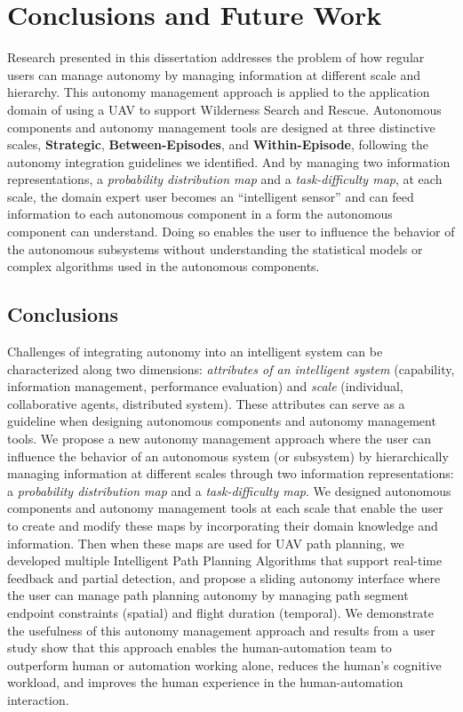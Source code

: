 \chapter[Conclusions and Future Work]{Conclusions and Future Work}
\label{chap:Conclusions}

Research presented in this dissertation addresses the problem of how regular users can manage autonomy by managing information at different scale and hierarchy. This autonomy management approach is applied to the application domain of using a UAV to support Wilderness Search and Rescue. Autonomous components and autonomy management tools are designed at three distinctive scales, \textbf{Strategic}, \textbf{Between-Episodes}, and \textbf{Within-Episode}, following the autonomy integration guidelines we identified. And by managing two information representations, a \textit{probability distribution map} and a \textit{task-difficulty map}, at each scale, the domain expert user becomes an ``intelligent sensor'' and can feed information to each autonomous component in a form the autonomous component can understand. Doing so enables the user to influence the behavior of the autonomous subsystems without understanding the statistical models or complex algorithms used in the autonomous components.

\section{Conclusions}
\label{conclusions}

Challenges of integrating autonomy into an intelligent system can be characterized along two dimensions: \textit{attributes of an intelligent system} (capability, information management, performance evaluation) and \textit{scale} (individual, collaborative agents, distributed system). These attributes can serve as a guideline when designing autonomous components and autonomy management tools. We propose a new autonomy management approach where the user can influence the behavior of an autonomous system (or subsystem) by hierarchically managing information at different scales through two information representations:  a \textit{probability distribution map} and a \textit{task-difficulty map}. We designed autonomous components and autonomy management tools at each scale that enable the user to create and modify these maps by incorporating their domain knowledge and information. Then when these maps are used for UAV path planning, we developed multiple Intelligent Path Planning Algorithms that support real-time feedback and partial detection, and propose a sliding autonomy interface where the user can manage path planning autonomy by managing path segment endpoint constraints (spatial) and flight duration (temporal). We demonstrate the usefulness of this autonomy management approach and results from a user study show that this approach enables the human-automation team to outperform human or automation working alone, reduces the human's cognitive workload, and improves the human experience in the human-automation interaction.

